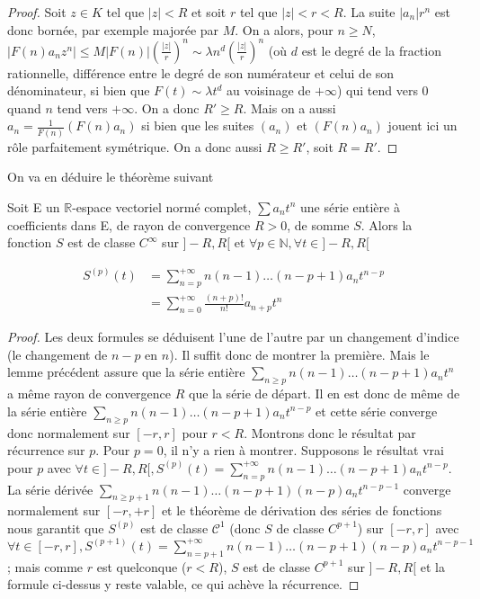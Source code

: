 \begin{proof}
Soit $z \in K$ tel que $|z| < R$ et soit $r$ tel que $|z| < r < R$. La suite $|a_n| r^n$ est donc bornée, par exemple majorée par $M$. On a alors, pour $n \geq N$, $|F(n) a_n z^n| \leq M |F(n)| \left(\frac{|z|}{r}\right)^n \sim \lambda n^d \left(\frac{|z|}{r}\right)^n$ (où $d$ est le degré de la fraction rationnelle, différence entre le degré de son numérateur et celui de son dénominateur, si bien que $F(t) \sim \lambda t^d$ au voisinage de $+\infty$) qui tend vers 0 quand $n$ tend vers $+\infty$. On a donc $R' \geq R$. Mais on a aussi $a_n = \frac{1}{F(n)} (F(n) a_n)$ si bien que les suites $(a_n)$ et $(F(n) a_n)$ jouent ici un rôle parfaitement symétrique. On a donc aussi $R \geq R'$, soit $R = R'$.
\end{proof}

On va en déduire le théorème suivant

\begin{thm}
Soit E un $\mathbb{R}$-espace vectoriel normé complet, $\sum a_n t^n$ une série entière à coefficients dans E, de rayon de convergence $R > 0$, de somme $S$. Alors la fonction $S$ est de classe $C^{\infty}$ sur $]-R,R[$ et $\forall p \in \mathbb{N}, \forall t \in ]-R,R[$

\begin{align*}
S^{(p)}(t) &= \sum_{n=p}^{+\infty} n(n-1)\ldots(n-p+1) a_n t^{n-p} \\
&= \sum_{n=0}^{+\infty} \frac{(n+p)!}{n!} a_{n+p} t^n
\end{align*}
\end{thm}

\begin{proof}
Les deux formules se déduisent l'une de l'autre par un changement d'indice (le changement de $n-p$ en $n$). Il suffit donc de montrer la première. Mais le lemme précédent assure que la série entière $\sum_{n\geq p} n(n-1)\ldots(n-p+1) a_n t^n$ a même rayon de convergence $R$ que la série de départ. Il en est donc de même de la série entière $\sum_{n\geq p} n(n-1)\ldots(n-p+1) a_n t^{n-p}$ et cette série converge donc normalement sur $[-r,r]$ pour $r < R$. Montrons donc le résultat par récurrence sur $p$. Pour $p=0$, il n'y a rien à montrer. Supposons le résultat vrai pour $p$ avec $\forall t \in ]-R,R[, S^{(p)}(t) = \sum_{n=p}^{+\infty} n(n-1)\ldots(n-p+1) a_n t^{n-p}$. La série dérivée $\sum_{n\geq p+1} n(n-1)\ldots(n-p+1)(n-p) a_n t^{n-p-1}$ converge normalement sur $[-r,+r]$ et le théorème de dérivation des séries de fonctions nous garantit que $S^{(p)}$ est de classe $\mathcal{C}^1$ (donc $S$ de classe $C^{p+1}$) sur $[-r,r]$ avec $\forall t \in [-r,r], S^{(p+1)}(t) = \sum_{n=p+1}^{+\infty} n(n-1)\ldots(n-p+1)(n-p) a_n t^{n-p-1}$; mais comme $r$ est quelconque ($r < R$), $S$ est de classe $C^{p+1}$ sur $]-R,R[$ et la formule ci-dessus y reste valable, ce qui achève la récurrence.
\end{proof}

